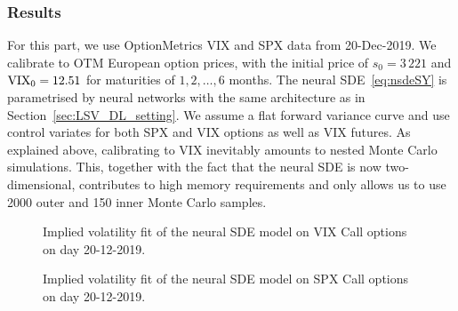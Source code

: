 \subsubsection{Results}
For this part, we use OptionMetrics VIX and SPX data from 20-Dec-2019. We calibrate to OTM European option prices, with the initial price of $s_0=3\,221$ and $\mathrm{VIX}_0=12.51$ for maturities of $1,2,\ldots,6$ months. The neural SDE~\eqref{eq:nsdeSY} is parametrised by neural networks with the same architecture as in Section~\ref{sec:LSV_DL_setting}. We assume a flat forward variance curve and use control variates for both SPX and VIX options as well as VIX futures. As explained above, calibrating to VIX inevitably amounts to nested Monte Carlo simulations. This, together with the fact that the neural SDE is now two-dimensional, contributes to high memory requirements and only allows us to use 2000 outer and 150 inner Monte Carlo samples.
\begin{figure}[htbp]
\centering
{}
\caption{Implied volatility fit of the neural SDE model on VIX Call options on day 20-12-2019.}\label{fig:NSDEvixcall}
\end{figure}


\begin{figure}[htbp]
\centering
{}
\caption{Implied volatility fit of the neural SDE model on SPX Call options on day 20-12-2019.}\label{fig:NSDEspxcall}
\end{figure}

